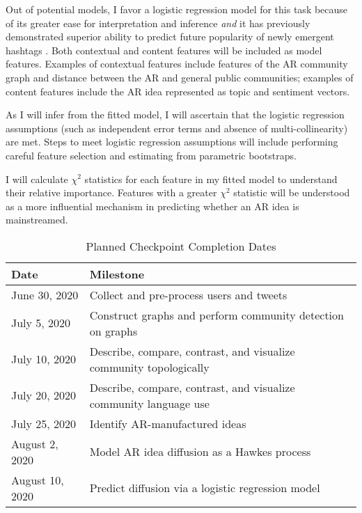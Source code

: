 \documentclass[acmlarge, screen, authorversion]{acmart}
\begin{document}
Out of potential models, I favor a logistic regression model for this task because of its greater ease for interpretation and inference \textit{and} it has previously demonstrated superior ability to predict future popularity of newly emergent hashtags \cite{maPredictingPopularityNewly2013}. Both contextual and content features will be included as model features. Examples of contextual features include features of the AR community graph and distance between the AR and general public communities; examples of content features include the AR idea represented as topic and sentiment vectors. 

As I will infer from the fitted model, I will ascertain that the logistic regression assumptions (such as independent error terms and absence of multi-collinearity) are met. Steps to meet logistic regression assumptions will include performing careful feature selection and estimating from parametric bootstraps.

I will calculate $\chi^2$ statistics for each feature in my fitted model to understand their relative importance. Features with a greater $\chi^2$ statistic will be understood as a more influential mechanism in predicting whether an AR idea is mainstreamed.

\begin{table}[htbp!]

  \caption{Planned Checkpoint Completion Dates}
  \label{table:timetable}
  
  \begin{tabular}{ l l  }
  
    \toprule
     Date & Milestone\\ 
    \midrule
June 30, 2020 & Collect and pre-process users and tweets\\
 \hline
July 5, 2020 & Construct graphs and perform community detection on graphs\\
  \hline
July 10, 2020 & Describe, compare, contrast, and visualize community topologically\\
  \hline
  July 20, 2020 & Describe, compare, contrast, and visualize community language use\\
  \hline
  July 25, 2020 & Identify AR-manufactured ideas\\
  \hline
  August 2, 2020 &  Model AR idea diffusion as a Hawkes process\\
  \hline
  August 10, 2020 & Predict diffusion via a logistic regression model\\
   \bottomrule
\end{tabular}
\end{table}
\end{document}
